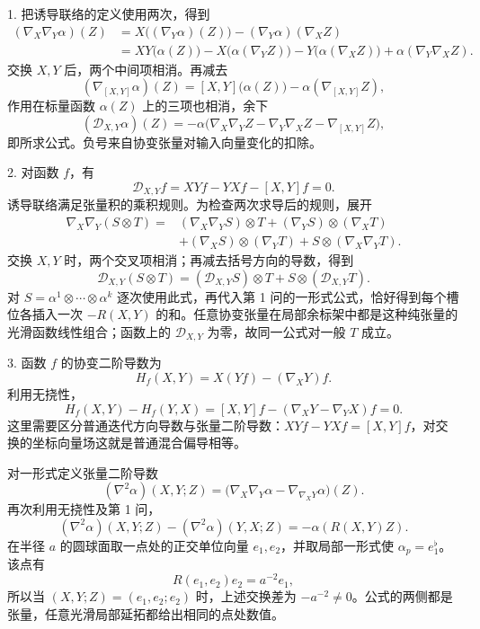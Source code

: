 \begin{solution}
	1. 把诱导联络的定义使用两次，得到
	\[
		\begin{aligned}
			(\nabla_X\nabla_Y\alpha)(Z)
			&=X\bigl((\nabla_Y\alpha)(Z)\bigr)
				-(\nabla_Y\alpha)(\nabla_XZ)\\
			&=XY\bigl(\alpha(Z)\bigr)
				-X\bigl(\alpha(\nabla_YZ)\bigr)
				-Y\bigl(\alpha(\nabla_XZ)\bigr)
				+\alpha(\nabla_Y\nabla_XZ).
		\end{aligned}
	\]
	交换 \(X,Y\) 后，两个中间项相消。再减去
	\[
		(\nabla_{[X,Y]}\alpha)(Z)
		=[X,Y]\bigl(\alpha(Z)\bigr)-\alpha(\nabla_{[X,Y]}Z),
	\]
	作用在标量函数 \(\alpha(Z)\) 上的三项也相消，余下
	\[
		(\mathcal D_{X,Y}\alpha)(Z)
		=-\alpha\bigl(
			\nabla_X\nabla_YZ-\nabla_Y\nabla_XZ-\nabla_{[X,Y]}Z
			\bigr),
	\]
	即所求公式。负号来自协变张量对输入向量变化的扣除。

	2. 对函数 \(f\)，有
	\[
		\mathcal D_{X,Y}f=XYf-YXf-[X,Y]f=0.
	\]
	诱导联络满足张量积的乘积规则。为检查两次求导后的规则，展开
	\[
		\begin{aligned}
			\nabla_X\nabla_Y(S\otimes T)
			={}&(\nabla_X\nabla_YS)\otimes T
				+(\nabla_YS)\otimes(\nabla_XT)\\
			&+(\nabla_XS)\otimes(\nabla_YT)
				+S\otimes(\nabla_X\nabla_YT).
		\end{aligned}
	\]
	交换 \(X,Y\) 时，两个交叉项相消；再减去括号方向的导数，得到
	\[
		\mathcal D_{X,Y}(S\otimes T)
		=(\mathcal D_{X,Y}S)\otimes T
			+S\otimes(\mathcal D_{X,Y}T).
	\]
	对 \(S=\alpha^1\otimes\cdots\otimes\alpha^k\) 逐次使用此式，再代入第 1 问的一形式公式，恰好得到每个槽位各插入一次 \(-R(X,Y)\) 的和。任意协变张量在局部余标架中都是这种纯张量的光滑函数线性组合；函数上的 \(\mathcal D_{X,Y}\) 为零，故同一公式对一般 \(T\) 成立。

	3. 函数 \(f\) 的协变二阶导数为
	\[
		H_f(X,Y)=X(Yf)-(\nabla_XY)f.
	\]
	利用无挠性，
	\[
		H_f(X,Y)-H_f(Y,X)
		=[X,Y]f-(\nabla_XY-\nabla_YX)f=0.
	\]
	这里需要区分普通迭代方向导数与张量二阶导数：\(XYf-YXf=[X,Y]f\)，对交换的坐标向量场这就是普通混合偏导相等。

	对一形式定义张量二阶导数
	\[
		(\nabla^2\alpha)(X,Y;Z)
		=\bigl(\nabla_X\nabla_Y\alpha
			-\nabla_{\nabla_XY}\alpha\bigr)(Z).
	\]
	再次利用无挠性及第 1 问，
	\[
		(\nabla^2\alpha)(X,Y;Z)-(\nabla^2\alpha)(Y,X;Z)
		=-\alpha(R(X,Y)Z).
	\]
	在半径 \(a\) 的圆球面取一点处的正交单位向量 \(e_1,e_2\)，并取局部一形式使 \(\alpha_p=e_1^\flat\)。该点有
	\[
		R(e_1,e_2)e_2=a^{-2}e_1,
	\]
	所以当 \((X,Y;Z)=(e_1,e_2;e_2)\) 时，上述交换差为 \(-a^{-2}\ne0\)。公式的两侧都是张量，任意光滑局部延拓都给出相同的点处数值。
\end{solution}

